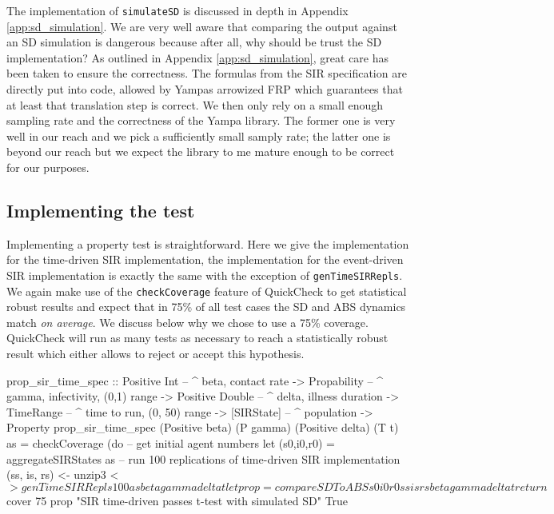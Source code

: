 The implementation of \texttt{simulateSD} is discussed in depth in Appendix \ref{app:sd_simulation}. We are very well aware that comparing the output against an SD simulation is dangerous because after all, why should be trust the SD implementation? As outlined in Appendix \ref{app:sd_simulation}, great care has been taken to ensure the correctness. The formulas from the SIR specification are directly put into code, allowed by Yampas arrowized FRP which guarantees that at least that translation step is correct. We then only rely on a small enough sampling rate and the correctness of the Yampa library. The former one is very well in our reach and we pick a sufficiently small samply rate; the latter one is beyond our reach but we expect the library to me mature enough to be correct for our purposes.

\subsection{Implementing the test}
Implementing a property test is straightforward. Here we give the implementation for the time-driven SIR implementation, the implementation for the event-driven SIR implementation is exactly the same with the exception of \texttt{genTimeSIRRepls}. We again make use of the \texttt{checkCoverage} feature of QuickCheck to get statistical robust results and expect that in 75\% of all test cases the SD and ABS dynamics match \textit{on average}. We discuss below why we chose to use a 75\% coverage. QuickCheck will run as many tests as necessary to reach a statistically robust result which either allows to reject or accept this hypothesis.

\begin{HaskellCode}
prop_sir_time_spec :: Positive Int    -- ^ beta, contact rate
                   -> Propability     -- ^ gamma, infectivity, (0,1) range
                   -> Positive Double -- ^ delta, illness duration
                   -> TimeRange       -- ^ time to run, (0, 50) range
                   -> [SIRState]      -- ^ population
                   -> Property
prop_sir_time_spec 
    (Positive beta) (P gamma) (Positive delta) (T t) as = checkCoverage (do
  -- get initial agent numbers
  let (s0,i0,r0) = aggregateSIRStates as
  -- run 100 replications of time-driven SIR implementation
  (ss, is, rs) <- unzip3 <$> genTimeSIRRepls 100 as beta gamma delta t
  let prop = compareSDToABS s0 i0 r0 ss is rs beta gamma delta t
  return $ cover 75 prop "SIR time-driven passes t-test with simulated SD" True
\end{HaskellCode}

